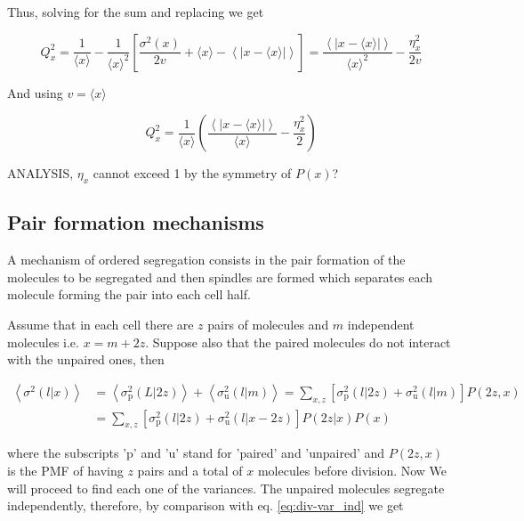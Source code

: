 Thus, solving for the sum and replacing we get

\begin{equation*}
  Q_x^2 = \frac{1}{\langle x\rangle}-\frac{1}{\langle x\rangle^2}\left[\frac{\sigma^2(x)}{2v}+\langle x\rangle-\left\langle\left|x-\langle x\rangle\right|\right\rangle\right] = \frac{\left\langle\left|x-\langle x\rangle\right|\right\rangle}{\langle x\rangle^2}-\frac{\eta_x^2}{2v}
\end{equation*}

And using $v=\langle x\rangle$

\begin{equation}
  \boxed{Q_x^2 = \frac{1}{\langle x\rangle}\left(\frac{\left\langle\left|x-\langle x\rangle\right|\right\rangle}{\langle x\rangle}-\frac{\eta_x^2}{2}\right)}
\end{equation}

ANALYSIS, $\eta_x$ cannot exceed 1 by the symmetry of $P(x)$?

\subsection{Pair formation mechanisms}
A mechanism of ordered segregation consists in the pair formation of the molecules to be segregated and then spindles are formed which separates each molecule forming the pair into each cell half.

Assume that in each cell there are $z$ pairs of molecules and $m$ independent molecules i.e. $x=m+2z$. Suppose also that the paired molecules do not interact with the unpaired ones, then

\begin{equation}
  \label{eq:div-pu}
  \begin{split}
  \left\langle\sigma^2(l|x)\right\rangle &= \left\langle\sigma^2_\text{p}(L|2z)\right\rangle + \left\langle\sigma^2_\text{u}(l|m)\right\rangle = \sum_{x,z}\left[\sigma^2_\text{p}(l|2z) + \sigma^2_\text{u}(l|m)\right]P(2z,x)\\
  &= \sum_{x,z}\left[\sigma^2_\text{p}(l|2z) + \sigma^2_\text{u}(l|x-2z)\right]P(2z|x)P(x)
  \end{split}
\end{equation}

where the subscripts 'p' and 'u' stand for 'paired' and 'unpaired' and $P(2z,x)$ is the PMF of having $z$ pairs and a total of $x$ molecules before division. Now We will proceed to find each one of the variances. The unpaired molecules segregate independently, therefore, by comparison with eq. \eqref{eq:div-var_ind} we get

